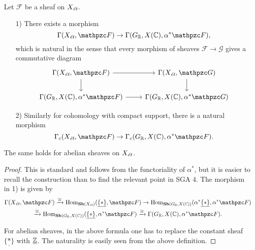 \begin{proposition}
  \label{prop:inverse-image-gamma}
  Let $\mathcal{F}$ be a sheaf on $X_\text{\it ét}$.

  \begin{enumerate}
  \item[1)] There exists a morphism
    \[ \Gamma (X_\text{\it ét}, \mathcal{F}) \to
      \Gamma (G_\RR, X (\CC), \alpha^* \mathcal{F}), \]
    which is natural in the sense that every morphism of sheaves
    $\mathcal{F} \to \mathcal{G}$ gives a commutative diagram
    \[ \begin{tikzcd}
        \Gamma (X_\text{\it ét}, \mathcal{F})\ar{d}\ar{r} & \Gamma (X_\text{\it ét}, \mathcal{G})\ar{d} \\
        \Gamma (G_\RR, X (\CC), \alpha^* \mathcal{F})\ar{r} & \Gamma (G_\RR, X (\CC), \alpha^* \mathcal{G})
      \end{tikzcd} \]

  \item[2)] Similarly for cohomology with compact support, there is a natural
    morphism
    \[ \Gamma_c (X_\text{\it ét}, \mathcal{F}) \to
      \Gamma_c (G_\RR, X (\CC), \alpha^* \mathcal{F}). \]
  \end{enumerate}

  The same holds for abelian sheaves on $X_\text{\it ét}$.

  \begin{proof} This is standard and follows from the functoriality of
    $\alpha^*$, but it is easier to recall the construction than to find the
    relevant point in SGA 4. The morphism in 1) is given by
    \begin{multline*}
      \Gamma (X_\text{\it ét}, \mathcal{F}) \xrightarrow{\isom}
      \Hom_{\categ{Sh} (X_\text{\it ét})} (\underline{\{ \ast \}}, \mathcal{F}) \to
      \Hom_{\categ{Sh} (G_\RR, X (\CC))} (\alpha^*\underline{\{ \ast \}}, \alpha^* \mathcal{F}) \\
      \xrightarrow{\isom} \Hom_{\categ{Sh} (G_\RR, X (\CC))} (\underline{\{ \ast \}}, \alpha^* \mathcal{F})
      \xrightarrow{\isom} \Gamma (G_\RR, X (\CC), \alpha^* \mathcal{F}).
    \end{multline*}

    For abelian sheaves, in the above formula one has to replace the constant
    sheaf $\underline{\{\ast\}}$ with $\underline{\mathbb{Z}}$. The naturality is
    easily seen from the above definition.


\end{proof}
\end{proposition}

